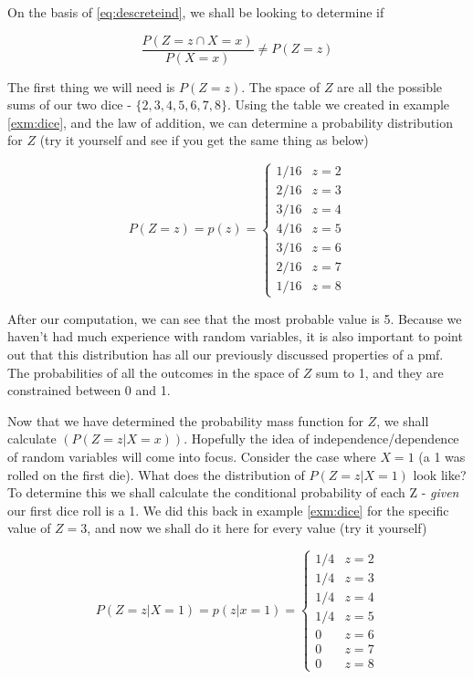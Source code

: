 \documentclass[
]{book}
\theoremstyle{definition}
\theoremstyle{definition}
\theoremstyle{definition}
\theoremstyle{definition}
\theoremstyle{remark}
\begin{document}
On the basis of \eqref{eq:descreteind}, we shall be looking to determine if

\[
\frac{P(Z = z \cap X = x)}{P(X = x)} \neq P(Z = z)
\]

The first thing we will need is \(P(Z = z)\). The space of \(Z\) are all the possible sums of our two dice - \(\{2,3,4,5,6,7,8\}\). Using the table we created in example \ref{exm:dice}, and the law of addition, we can determine a probability distribution for \(Z\) (try it yourself and see if you get the same thing as below)

\[
P(Z=z) = p(z) = 
\begin{cases}
1/16 & z = 2 \\
2/16 & z = 3 \\
3/16 & z = 4 \\
4/16 & z = 5 \\
3/16 & z = 6 \\
2/16 & z = 7 \\
1/16 & z = 8
\end{cases}
\]

After our computation, we can see that the most probable value is 5. Because we haven't had much experience with random variables, it is also important to point out that this distribution has all our previously discussed properties of a pmf. The probabilities of all the outcomes in the space of \(Z\) sum to 1, and they are constrained between 0 and 1.

Now that we have determined the probability mass function for \(Z\), we shall calculate \((P(Z = z|X = x))\). Hopefully the idea of independence/dependence of random variables will come into focus. Consider the case where \(X = 1\) (a 1 was rolled on the first die). What does the distribution of \(P(Z = z|X = 1)\) look like? To determine this we shall calculate the conditional probability of each Z - \emph{given} our first dice roll is a 1. We did this back in example \ref{exm:dice} for the specific value of \(Z = 3\), and now we shall do it here for every value (try it yourself)

\[
P(Z=z|X=1) = p(z|x=1) = 
\begin{cases}
1/4 & z = 2 \\
1/4 & z = 3 \\
1/4 & z = 4 \\
1/4 & z = 5 \\
0 & z = 6 \\
0 & z = 7 \\
0 & z = 8
\end{cases}
\]
\end{document}
